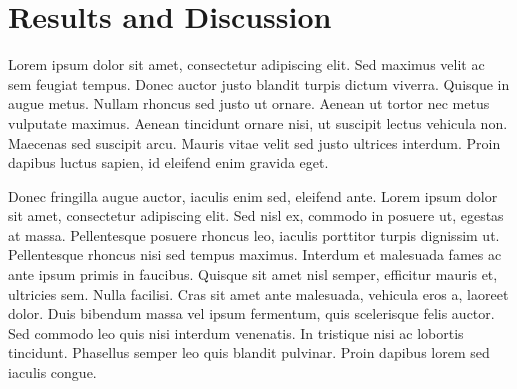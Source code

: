 \documentclass{ltjarticle}
\begin{document}



\section{Results and Discussion}

Lorem ipsum dolor sit amet, consectetur adipiscing elit. Sed maximus velit ac sem feugiat tempus. Donec auctor justo blandit turpis dictum viverra. Quisque in augue metus. Nullam rhoncus sed justo ut ornare. Aenean ut tortor nec metus vulputate maximus. Aenean tincidunt ornare nisi, ut suscipit lectus vehicula non. Maecenas sed suscipit arcu. Mauris vitae velit sed justo ultrices interdum. Proin dapibus luctus sapien, id eleifend enim gravida eget.

Donec fringilla augue auctor, iaculis enim sed, eleifend ante. Lorem ipsum dolor sit amet, consectetur adipiscing elit. Sed nisl ex, commodo in posuere ut, egestas at massa. Pellentesque posuere rhoncus leo, iaculis porttitor turpis dignissim ut. Pellentesque rhoncus nisi sed tempus maximus. Interdum et malesuada fames ac ante ipsum primis in faucibus. Quisque sit amet nisl semper, efficitur mauris et, ultricies sem. Nulla facilisi. Cras sit amet ante malesuada, vehicula eros a, laoreet dolor. Duis bibendum massa vel ipsum fermentum, quis scelerisque felis auctor. Sed commodo leo quis nisi interdum venenatis. In tristique nisi ac lobortis tincidunt. Phasellus semper leo quis blandit pulvinar. Proin dapibus lorem sed iaculis congue.
\end{document}
